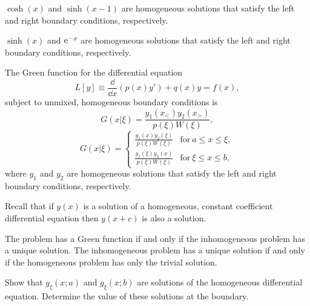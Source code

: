 {%
\begin{Hint}
  \label{hint y-y=f y0=y1=0}
  $\cosh(x)$ and $\sinh(x-1)$ are homogeneous solutions that satisfy the 
  left and right boundary conditions, respectively.
\end{Hint}



\begin{Hint}
  \label{hint y-y=f y0=yinf=0}
  $\sinh(x)$ and $\mathop{\mathrm{e}}\nolimits^{-x}$ are homogeneous solutions that satisfy the 
  left and right boundary conditions, respectively.
\end{Hint}



\begin{Hint}
  \label{hint xu+u=f}
  The Green function for the differential equation
  \[
  L[y] \equiv \frac{\dd}{\dd x} ( p(x) y' ) + q(x) y = f(x),
  \]
  subject to unmixed, homogeneous boundary conditions is
  \[
  G(x|\xi) = \frac{ y_1(x_<) y_2(x_>) }{ p(\xi) W(\xi) },
  \]
  \[
  G(x|\xi) = \begin{cases}
    \frac{ y_1(x) y_2(\xi) }{ p(\xi) W(\xi) } &\mathrm{for}\ a \leq x \leq \xi, \\
    \frac{ y_1(\xi) y_2(x) }{ p(\xi) W(\xi) } &\mathrm{for}\ \xi \leq x \leq b, 
  \end{cases}
  \]
  where $y_1$ and $y_2$ are homogeneous solutions that satisfy the left 
  and right boundary conditions, respectively.

  Recall that if $y(x)$ is a solution of a homogeneous, constant coefficient
  differential equation then $y(x+c)$ is also a solution.
\end{Hint}



\begin{Hint}
  \label{hint y+lambday=f}
  The problem has a Green function if and only if the inhomogeneous problem
  has a unique solution.  The inhomogeneous problem has a unique solution
  if and only if the homogeneous problem has only the trivial solution.
\end{Hint}





\begin{Hint}
  \label{hint Lu=pu+qu=f}
  Show that $g_\xi(x;a)$ and $g_\xi(x;b)$ are solutions of the homogeneous
  differential equation.  Determine the value of these solutions at the 
  boundary.
\end{Hint}





}
